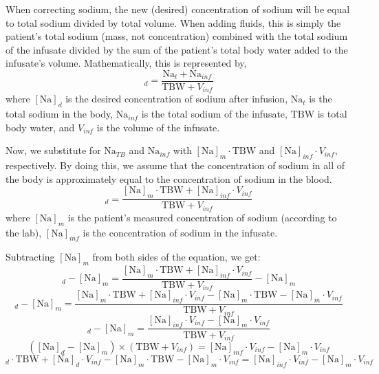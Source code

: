\documentclass[12pt]{article}
\newcommand{\na}{\mathrm{Na}}
\newcommand{\tbw}{\mathrm{TBW}}
\begin{document}
	
	When correcting sodium, the new (desired) concentration of sodium will be equal to total sodium divided by total volume. When adding fluids, this is simply the patient's total sodium (mass, not concentration) combined with the total sodium of the infusate divided by the sum of the patient's total body water added to the infusate's volume. Mathematically, this is represented by,
	\begin{equation}
		[\na]_d = \frac{\na_t + \na_{inf}}{\tbw + V_{inf}}
	\end{equation}
	where $[\na]_d$ is the desired concentration of sodium after infusion, $\na_t$ is the total sodium in the body, $\na_{inf}$ is the total sodium of the infusate, $\tbw$ is total body water, and $V_{inf}$ is the volume of the infusate.

	Now, we substitute for $\na_{TB}$ and $\na_{inf}$ with $[\na]_m \cdot \tbw$ and $[\na]_{inf} \cdot V_{inf}$, respectively. By doing this, we assume that the concentration of sodium in all of the body is approximately equal to the concentration of sodium in the blood.
	\begin{equation}
		[\na]_d = \frac{[\na]_m \cdot \tbw + [\na]_{inf} \cdot V_{inf}}{\tbw + V_{inf}}
	\end{equation}
	where $[\na]_m$ is the patient's measured concentration of sodium (according to the lab), $[\na]_{inf}$ is the concentration of sodium in the infusate.

	Subtracting $[\na]_m$ from both sides of the equation, we get:
	\begin{equation}
		[\na]_d - [\na]_m = \frac{[\na]_m \cdot \tbw + [\na]_{inf} \cdot V_{inf}}{\tbw + V_{inf}} - [\na]_m
	\end{equation}
	\begin{equation}
		[\na]_d - [\na]_m = \frac{[\na]_m \cdot \tbw + [\na]_{inf} \cdot V_{inf} - [\na]_m \cdot \tbw - [\na]_m \cdot V_{inf}}{\tbw + V_{inf}}
	\end{equation}
	\begin{equation}
		[\na]_d - [\na]_m = \frac{[\na]_{inf} \cdot V_{inf} - [\na]_m \cdot V_{inf}}{\tbw + V_{inf}}
	\end{equation}
	\begin{equation}
		([\na]_d - [\na]_m) \times (\tbw + V_{inf}) = [\na]_{inf} \cdot V_{inf} - [\na]_m \cdot V_{inf}
	\end{equation}
	\begin{equation}
		[\na]_d \cdot \tbw + [\na]_d \cdot V_{inf} - [\na]_m \cdot \tbw - [\na]_m \cdot V_{inf} = [\na]_{inf} \cdot V_{inf} - [\na]_m \cdot V_{inf}
	\end{equation}
\end{document}
